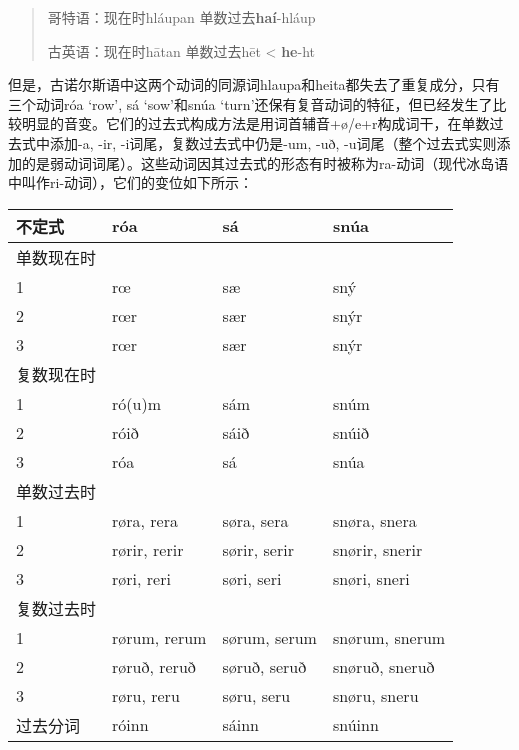\begin{quote}
  哥特语：现在时hláupan 单数过去\textbf{haí}-hláup

  古英语：现在时hātan 单数过去hēt \textless{} \textbf{he}-ht
\end{quote}

但是，古诺尔斯语中这两个动词的同源词hlaupa和heita都失去了重复成分，只有三个动词róa
`row‌', sá `sow‌'和snúa
`turn‌'还保有复音动词的特征，但已经发生了比较明显的音变。它们的过去式构成方法是用词首辅音+ø/e+r构成词干，在单数过去式中添加-a,
-ir, -i词尾，复数过去式中仍是-um, -uð,
-u词尾（整个过去式实则添加的是弱动词词尾）。这些动词因其过去式的形态有时被称为ra-动词（现代冰岛语中叫作ri-动词），它们的变位如下所示：

\begin{longtable}{llll}
  \toprule
  不定式   & róa          & sá           & snúa           \\
  \midrule
  \endhead
  \bottomrule
  \endfoot
  单数现在时 &              &              &                \\
  1     & rœ           & sæ           & sný            \\
  2     & rœr          & sær          & snýr           \\
  3     & rœr          & sær          & snýr           \\
  复数现在时 &              &              &                \\
  1     & ró(u)m       & sám          & snúm           \\
  2     & róið         & sáið         & snúið          \\
  3     & róa          & sá           & snúa           \\
  单数过去时 &              &              &                \\
  1     & røra, rera   & søra, sera   & snøra, snera   \\
  2     & rørir, rerir & sørir, serir & snørir, snerir \\
  3     & røri, reri   & søri, seri   & snøri, sneri   \\
  复数过去时 &              &              &                \\
  1     & rørum, rerum & sørum, serum & snørum, snerum \\
  2     & røruð, reruð & søruð, seruð & snøruð, sneruð \\
  3     & røru, reru   & søru, seru   & snøru, sneru   \\
  过去分词  & róinn        & sáinn        & snúinn         \\
\end{longtable}

